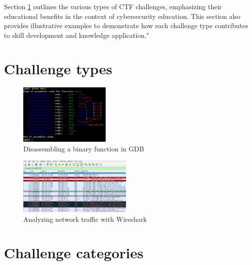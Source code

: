 \documentclass[conference]{IEEEtran}
\begin{document}
Section \ref{sec-challenge-types} outlines the various types of CTF challenges,
emphasizing their educational benefits in the context of cybersecurity
education. This section also provides illustrative examples to demonstrate how
each challenge type contributes to skill development and knowledge
application."

\cite{gyorok2014}
\cite{safar2019}
\cite{beszedes2023}

\cite{rahman2020}

\cite{schneider2013}

\cite{eagle2020}

\cite{butun2019}

\cite{ziade2004}

\section{Challenge types}
\label{sec-challenge-types}

\begin{figure}[htbp]
	\centering
	\includegraphics[width=0.4\textwidth]{fig/gdb.png}
	\caption{Disassembling a binary function in GDB}
	\label{fig-gdb}
\end{figure}

\begin{figure}[htbp]
	\centering
	\includegraphics[width=0.5\textwidth]{fig/wireshark.png}
	\caption{Analyzing network traffic with Wireshark}
	\label{fig-wireshark}
\end{figure}

\section{Challenge categories}
\end{document}
